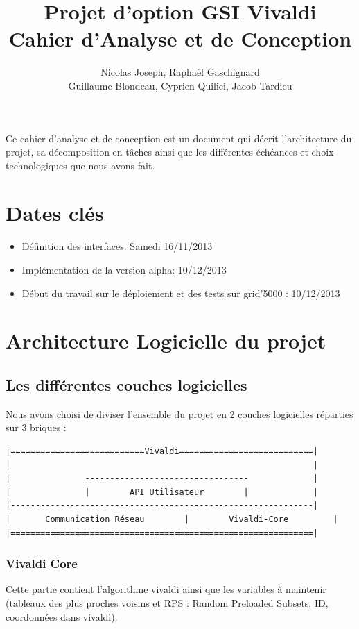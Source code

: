 \documentclass[11pt,a4paper]{article}
\title{Projet d'option GSI Vivaldi \\ Cahier d'Analyse et de Conception}
\author{Nicolas Joseph, Raphaël Gaschignard\\ Guillaume Blondeau, Cyprien Quilici, Jacob Tardieu}
\begin{document}
\maketitle
Ce cahier d’analyse et de conception est un document qui décrit l’architecture du projet, sa décomposition en tâches ainsi que les différentes échéances et choix technologiques que nous avons fait.
\section{Dates clés}

\begin{itemize}
\item Définition des interfaces: Samedi 16/11/2013
\item Implémentation de la version alpha: 10/12/2013
\item Début du travail sur le déploiement et des tests sur grid’5000 : 10/12/2013
\end{itemize}

\section{Architecture Logicielle du projet}
\subsection{Les différentes couches logicielles} \label{coucheslogicielles}
Nous avons choisi de diviser l’ensemble du projet en 2 couches logicielles réparties sur 3 briques :

\begin{verbatim}
|===========================Vivaldi===========================|
|                                                             |
|               ---------------------------------             |
|               |        API Utilisateur        |             |
|-------------------------------------------------------------|
|     	Communication Réseau    	|        Vivaldi-Core         |
|=============================================================|
\end{verbatim}

\subsubsection{Vivaldi Core}
Cette partie contient l’algorithme vivaldi ainsi que les variables à maintenir (tableaux des plus proches voisins et RPS : Random Preloaded Subsets, ID, coordonnées dans vivaldi).\\
\end{document}
